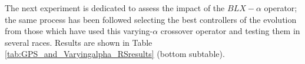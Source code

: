 \documentclass[10pt,journal,compsoc]{IEEEtran}
\begin{document}
The next experiment is dedicated to assess the impact of the
$BLX-\alpha$ operator; the same process has been followed
selecting the best controllers of the evolution from those which
have used this varying-$\alpha$ crossover operator and testing them in several
races. Results are shown in Table \ref{tab:GPS_and_Varyingalpha_RSresults} (bottom subtable). 
%
%
%
%
%				
%				
\end{document}

